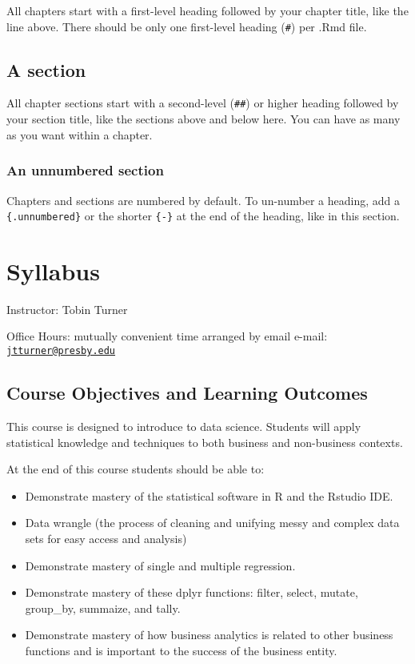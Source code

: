\documentclass[
]{book}
\providecommand{\tightlist}{%
  \setlength{\itemsep}{0pt}\setlength{\parskip}{0pt}}
\begin{document}
All chapters start with a first-level heading followed by your chapter title, like the line above. There should be only one first-level heading (\texttt{\#}) per .Rmd file.

\hypertarget{a-section}{%
\section{A section}\label{a-section}}

All chapter sections start with a second-level (\texttt{\#\#}) or higher heading followed by your section title, like the sections above and below here. You can have as many as you want within a chapter.

\hypertarget{an-unnumbered-section}{%
\subsection*{An unnumbered section}\label{an-unnumbered-section}}

Chapters and sections are numbered by default. To un-number a heading, add a \texttt{\{.unnumbered\}} or the shorter \texttt{\{-\}} at the end of the heading, like in this section.

\hypertarget{syllabus}{%
\chapter{Syllabus}\label{syllabus}}

Instructor: Tobin Turner

Office Hours: mutually convenient time arranged by email e-mail: \href{mailto:jtturner@presby.edu}{\nolinkurl{jtturner@presby.edu}}

\hypertarget{course-objectives-and-learning-outcomes}{%
\section{Course Objectives and Learning Outcomes}\label{course-objectives-and-learning-outcomes}}

This course is designed to introduce to data science. Students will apply statistical knowledge and techniques to both business and non-business contexts.

At the end of this course students should be able to:

\begin{itemize}
\tightlist
\item
  Demonstrate mastery of the statistical software in R and the Rstudio IDE.
\item
  Data wrangle (the process of cleaning and unifying messy and complex data sets for easy access and analysis)
\item
  Demonstrate mastery of single and multiple regression.
\item
  Demonstrate mastery of these dplyr functions: filter, select, mutate, group\_by, summaize, and tally.
\item
  Demonstrate mastery of how business analytics is related to other business functions and is important to the success of the business entity.
\end{itemize}
\end{document}
